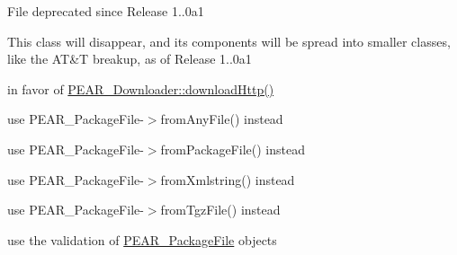 \begin{DoxyRefList}
\label{deprecated__deprecated000011}%
%
File deprecated since Release 1..\+0a1 

\label{deprecated__deprecated000012}%
%
This class will disappear, and its components will be spread into smaller classes, like the AT\&T breakup, as of Release 1..\+0a1  
\item[Member \mbox{\hyperlink{classPEAR__Common_a2a830a2ea2c16a4329b3ade4dbd97690}{P\+E\+A\+R\+\_\+\+Common::download\+Http}} (\$url, \&\$ui, \$save\+\_\+dir=\textquotesingle{}.\textquotesingle{}, \$callback=null)]\label{deprecated__deprecated000019}%
%
in favor of \mbox{\hyperlink{classPEAR__Downloader_a63e1fa054a13abc5307b6dfcd0e259fe}{P\+E\+A\+R\+\_\+\+Downloader\+::download\+Http()}}  
\item[Member \mbox{\hyperlink{classPEAR__Common_a5de7cd72cf95e6a8d0abcabd38da60b5}{P\+E\+A\+R\+\_\+\+Common::info\+From\+Any}} (\$info)]\label{deprecated__deprecated000016}%
%
use P\+E\+A\+R\+\_\+\+Package\+File-\/$>$from\+Any\+File() instead  
\item[Member \mbox{\hyperlink{classPEAR__Common_ab419273975fd72f23ec00da396f3a636}{P\+E\+A\+R\+\_\+\+Common::info\+From\+Description\+File}} (\$descfile)]\label{deprecated__deprecated000014}%
%
use P\+E\+A\+R\+\_\+\+Package\+File-\/$>$from\+Package\+File() instead 
\item[Member \mbox{\hyperlink{classPEAR__Common_a4bf50c15fb8dddc2807afc02d9b6f247}{P\+E\+A\+R\+\_\+\+Common::info\+From\+String}} (\$data)]\label{deprecated__deprecated000015}%
%
use P\+E\+A\+R\+\_\+\+Package\+File-\/$>$from\+Xmlstring() instead 
\item[Member \mbox{\hyperlink{classPEAR__Common_a3cf67eaaa3f021bf43ee68279e93c5b6}{P\+E\+A\+R\+\_\+\+Common::info\+From\+Tgz\+File}} (\$file)]\label{deprecated__deprecated000013}%
%
use P\+E\+A\+R\+\_\+\+Package\+File-\/$>$from\+Tgz\+File() instead 
\item[Member \mbox{\hyperlink{classPEAR__Common_aa0e34e60a0c4d94043d3870f79e12911}{P\+E\+A\+R\+\_\+\+Common::validate\+Package\+Info}} (\$info, \&\$errors, \&\$warnings, \$dir\+\_\+prefix=\textquotesingle{}\textquotesingle{})]\label{deprecated__deprecated000018}%
%
use the validation of \mbox{\hyperlink{classPEAR__PackageFile}{P\+E\+A\+R\+\_\+\+Package\+File}} objects  

\end{DoxyRefList}

